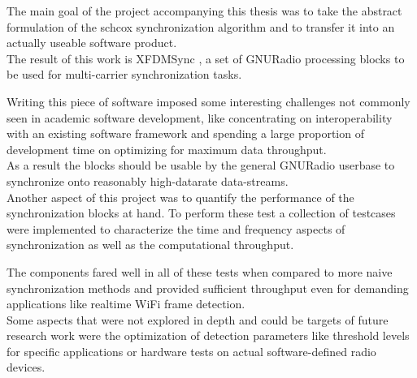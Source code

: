 The main goal of the project accompanying this thesis was
to take the abstract formulation of the \acrlong{schcox}
synchronization algorithm and to transfer it into an actually
useable software product. \\

The result of this work is XFDMSync \cite{xfdmsyncweb},
a set of GNURadio processing blocks to be used for multi-carrier
synchronization tasks.

Writing this piece of software imposed some interesting
challenges not commonly seen in academic software development,
like concentrating on interoperability with an existing
software framework and spending a large proportion of
development time on optimizing for maximum data throughput. \\

As a result the blocks should be usable
by the general GNURadio userbase to synchronize onto
reasonably high-datarate data-streams. \\

Another aspect of this project was to quantify
the performance of the synchronization blocks at hand.
To perform these test a collection of testcases
were implemented to characterize the
time and frequency aspects of synchronization as
well as the computational throughput.

The components fared well in all of these tests
when compared to more naive synchronization
methods and provided sufficient throughput
even for demanding applications like realtime WiFi frame
detection. \\

Some aspects that were not explored in depth
and could be targets of future research work
were the optimization of detection parameters
like threshold levels for specific applications
or hardware tests on actual software-defined radio
devices.
